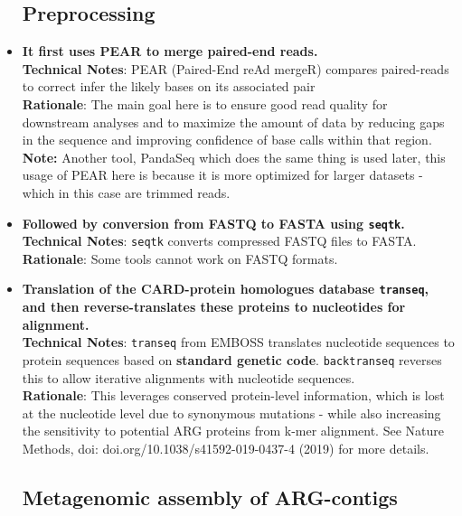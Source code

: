 \documentclass[11pt]{article}
\begin{document}
\begin{itemize}
	\subsection{Preprocessing}
	\item \textbf{It first uses PEAR to merge paired-end reads.}\\
	\textbf{Technical Notes}: PEAR (Paired-End reAd mergeR) compares paired-reads to correct infer the likely  bases on its associated pair\\
	\textbf{Rationale}: The main goal here is to ensure good read quality for downstream analyses and to maximize the amount of data by reducing gaps in the sequence and improving confidence of base calls within that region.\\
	\textbf{Note:} Another tool, PandaSeq which does the same thing is used later, this usage of PEAR here is because it is more optimized for larger datasets - which in this case are trimmed reads.
	
	\item \textbf{Followed by conversion from FASTQ to FASTA using \texttt{seqtk}.}\\
	\textbf{Technical Notes}: \texttt{seqtk} converts compressed FASTQ files to FASTA. \\
	\textbf{Rationale}: Some tools cannot work on FASTQ formats.
	
	\item \textbf{Translation of the CARD-protein homologues database \texttt{transeq}, and then reverse-translates these proteins to nucleotides for alignment.}\\
	\textbf{Technical Notes}: \texttt{transeq} from EMBOSS translates nucleotide sequences to protein sequences based on \textbf{standard genetic code}. \texttt{backtranseq} reverses this to allow iterative alignments with nucleotide sequences. \\
	\textbf{Rationale}: This leverages conserved protein-level information, which is lost at the nucleotide level due to synonymous mutations - while also increasing the sensitivity to potential ARG proteins from k-mer alignment. See Nature Methods, doi: doi.org/10.1038/s41592-019-0437-4 (2019) for more details.
	
	\subsection{Metagenomic assembly of ARG-contigs}
		

\end{itemize}
\end{document}
